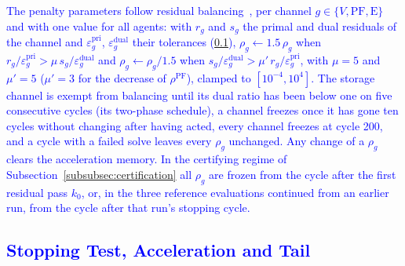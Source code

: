 \documentclass[preprint,12pt]{elsarticle}
\begin{document}
\textcolor{blue}{
    The penalty parameters follow residual balancing~\cite{boyd_admm_2011}, per channel $g \in \{V, \text{PF}, \text{E}\}$ and with one value for all agents: with $r_g$ and $s_g$ the primal and dual residuals of the channel and $\varepsilon^{\text{pri}}_g$, $\varepsilon^{\text{dual}}_g$ their tolerances (\ref{app:admm_updated_stopping}), $\rho_g \gets 1.5\,\rho_g$ when $r_g/\varepsilon^{\text{pri}}_g > \mu\, s_g/\varepsilon^{\text{dual}}_g$ and $\rho_g \gets \rho_g/1.5$ when $s_g/\varepsilon^{\text{dual}}_g > \mu'\, r_g/\varepsilon^{\text{pri}}_g$, with $\mu = 5$ and $\mu' = 5$ ($\mu' = 3$ for the decrease of $\rho^{\text{PF}}$), clamped to $[10^{-4}, 10^{4}]$. The storage channel is exempt from balancing until its dual ratio has been below one on five consecutive cycles (its two-phase schedule), a channel freezes once it has gone ten cycles without changing after having acted, every channel freezes at cycle 200, and a cycle with a failed solve leaves every $\rho_g$ unchanged. Any change of a $\rho_g$ clears the acceleration memory. In the certifying regime of Subsection~\ref{subsubsec:certification} all $\rho_g$ are frozen from the cycle after the first residual pass $k_0$, or, in the three reference evaluations continued from an earlier run, from the cycle after that run's stopping cycle.
}

\subsection{\textcolor{blue}{Stopping Test, Acceleration and Tail}}
\label{app:admm_updated_stopping}
\end{document}
